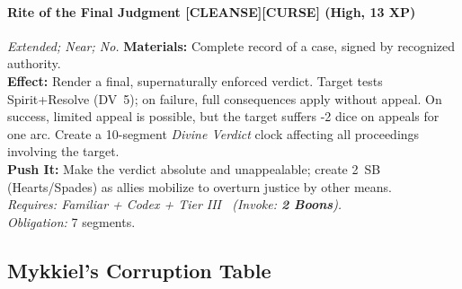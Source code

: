 \paragraph{Rite of the Final Judgment \textnormal{[CLEANSE][CURSE]} (High, 13 XP)} \emph{Extended; Near; No.}
\textbf{Materials:} Complete record of a case, signed by recognized authority.\\
\textbf{Effect:} Render a final, supernaturally enforced verdict. Target tests Spirit+Resolve (DV~5); on failure, full consequences apply without appeal. On success, limited appeal is possible, but the target suffers -2 dice on appeals for one arc. Create a 10-segment \emph{Divine Verdict} clock affecting all proceedings involving the target.\\
\textbf{Push It:} Make the verdict absolute and unappealable; create 2~SB (Hearts/Spades) as allies mobilize to overturn justice by other means.\\
\emph{Requires: Familiar + Codex + Tier III \ (\textit{Invoke:} \textbf{2 Boons}).}\\
\emph{Obligation:} 7 segments.

\subsection*{Mykkiel's Corruption Table}
\label{sec:mykkiel-corruption}

